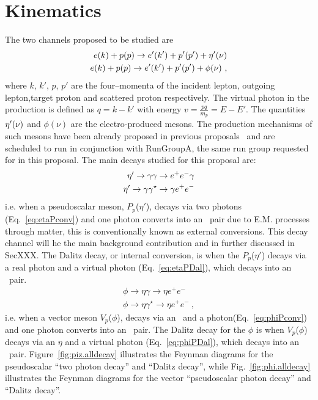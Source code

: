 \section{Kinematics}\label{sec:kinematics}
The two channels proposed to be studied are 
\begin{align}
e(k)+p(p)\to e'(k') + p'(p') +\eta^{\prime}(\nu) \label{eq:etaP} \\
e(k)+p(p)\to e'(k') + p'(p') + \phi(\nu)  \label{eq:phiP} \ ,
\end{align}
where $k$, $k'$, $p$, $p'$ are the four–momenta of the incident lepton, outgoing lepton,target proton and scattered proton respectively. The virtual photon in the production is defined as $q=k-k'$ with energy $v = \frac{pq}{m_p} = E - E'$. The quantities $\eta^{\prime}(\nu)$ and $\phi(\nu)$ are the electro-produced mesons. The production mechanisms of such mesons have been already proposed in previous proposals~\cite{clas.proposal.eta,clas.proposal.phi} and are scheduled to run in conjunction with RunGroupA, the same run group requested for in this proposal.
The main decays studied for this proposal are:
\begin{align}
\eta^{\prime} \rightarrow \gamma \gamma \to e^+e^- \gamma \label{eq:etaPconv} \\
\eta^{\prime} \rightarrow \gamma \gamma^\star \to \gamma e^+e^- \label{eq:etaPDal} 
\end{align}
i.e. when a pseudoscalar meson, $P_p$($\eta'$), decays via two photons (Eq.~\ref{eq:etaPconv}) and one photon converts into an \epemT \ pair due to E.M. processes through matter, this is conventionally known as external conversions. This decay channel will he the main background contribution and in further discussed in SecXXX. The Dalitz decay, or internal conversion, is when the $P_p$($\eta'$) decays via a real photon and a virtual photon (Eq.~\ref{eq:etaPDal}), which decays into an \epemT \ pair.
\begin{align}
\phi \rightarrow  \eta \gamma \to \eta e^+e^- \label{eq:phiPconv} \\
\phi \rightarrow \eta  \gamma^\star \to \eta  e^+e^-\label{eq:phiPDal} \ ,
\end{align}
i.e. when a vector meson $V_p$($\phi$), decays via an \etaT \ and a photon(Eq.~\ref{eq:phiPconv}) and one photon converts into an \epemT \ pair. The Dalitz decay for the $\phi$ is when $V_p$($\phi$) decays via an $\eta$ and a virtual photon (Eq.~\ref{eq:phiPDal}), which decays into an \epemT \ pair.
Figure~\ref{fig:piz.alldecay} illustrates the Feynman diagrams for the pseudoscalar ``two photon decay'' and  ``Dalitz decay'', while Fig.~\ref{fig:phi.alldecay} illustrates the Feynman diagrams for the vector ``pseudoscalar photon decay'' and  ``Dalitz decay''.
